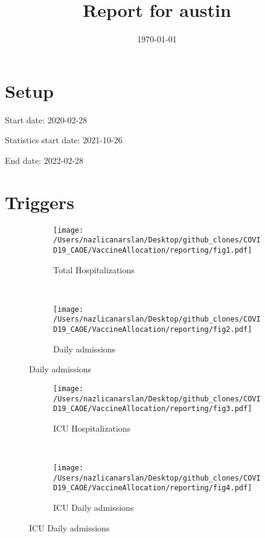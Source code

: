 \documentclass{article}
\title{Report for austin}
\author{}
\date{\today}
\begin{document}
\maketitle

\section*{Setup}

Start date: 2020-02-28

Statistics start date: 2021-10-26

End date: 2022-02-28 




\section*{Triggers}
\begin{figure}[!htb]
  \centering
  \setlength{\unitlength}{1cm}
    \begin{subfigure}[b]{0.475\linewidth}
    \centering
        \texttt{[image: /Users/nazlicanarslan/Desktop/github\_clones/COVID19\_CAOE/VaccineAllocation/reporting/fig1.pdf]}
        \caption{Total Hospitalizations}
        \label{fig:IHT}
    \end{subfigure}
    ~
    \begin{subfigure}[b]{0.475\linewidth}
    \centering
         \texttt{[image: /Users/nazlicanarslan/Desktop/github\_clones/COVID19\_CAOE/VaccineAllocation/reporting/fig2.pdf]}
        \caption{Daily admissions}
        \label{fig:ToIHT}
    \end{subfigure}
\end{figure}
\vspace{1cm}
\begin{figure}[!htb]
	\centering
	\setlength{\unitlength}{1cm}
	\begin{subfigure}[b]{0.475\linewidth}
		\centering
		\texttt{[image: /Users/nazlicanarslan/Desktop/github\_clones/COVID19\_CAOE/VaccineAllocation/reporting/fig3.pdf]}
		\caption{ICU Hospitalizations}
		\label{fig:ICU}
	\end{subfigure}
	~
	\begin{subfigure}[b]{0.475\linewidth}
		\centering
		\texttt{[image: /Users/nazlicanarslan/Desktop/github\_clones/COVID19\_CAOE/VaccineAllocation/reporting/fig4.pdf]}
		\caption{ICU Daily admissions}
		\label{fig:ToICU}
	\end{subfigure}
\end{figure}
\end{document}
